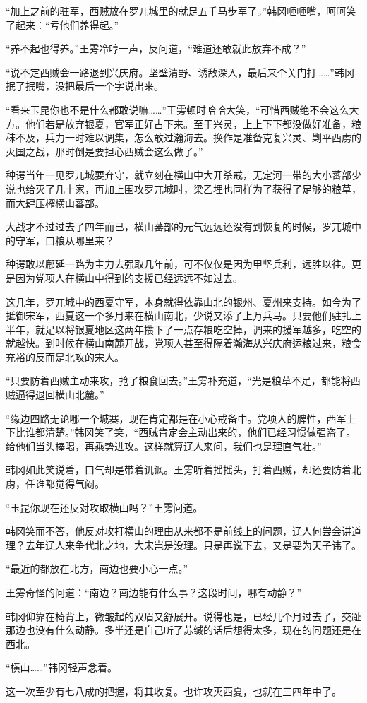 “加上之前的驻军，西贼放在罗兀城里的就足五千马步军了。”韩冈咂咂嘴，呵呵笑了起来：“亏他们养得起。”

“养不起也得养。”王雱冷哼一声，反问道，“难道还敢就此放弃不成？”

“说不定西贼会一路退到兴庆府。坚壁清野、诱敌深入，最后来个关门打……”韩冈抿了抿嘴，没把最后一个字说出来。

“看来玉昆你也不是什么都敢说嘛……”王雱顿时哈哈大笑，“可惜西贼绝不会这么大方。他们若是放弃银夏，官军正好占下来。至于兴灵，上上下下都没做好准备，粮秣不及，兵力一时难以调集，怎么敢过瀚海去。换作是准备克复兴灵、剿平西虏的灭国之战，那时倒是要担心西贼会这么做了。”

种谔当年一见罗兀城要弃守，就立刻在横山中大开杀戒，无定河一带的大小蕃部少说也给灭了几十家，再加上围攻罗兀城时，梁乙埋也同样为了获得了足够的粮草，而大肆压榨横山蕃部。

大战才不过过去了四年而已，横山蕃部的元气远远还没有到恢复的时候，罗兀城中的守军，口粮从哪里来？

种谔敢以鄜延一路为主力去强取几年前，可不仅仅是因为甲坚兵利，远胜以往。更是因为党项人在横山中得到的支援已经远远不如过去。

这几年，罗兀城中的西夏守军，本身就得依靠山北的银州、夏州来支持。如今为了抵御宋军，西夏这一个多月来在横山南北，少说又添了上万兵马。只要他们驻扎上半年，就足以将银夏地区这两年攒下了一点存粮吃空掉，调来的援军越多，吃空的就越快。到时候在横山南麓开战，党项人甚至得隔着瀚海从兴庆府运粮过来，粮食充裕的反而是北攻的宋人。

“只要防着西贼主动来攻，抢了粮食回去。”王雱补充道，“光是粮草不足，都能将西贼逼得退回横山北麓。”

“缘边四路无论哪一个城寨，现在肯定都是在小心戒备中。党项人的脾性，西军上下比谁都清楚。”韩冈笑了笑，“西贼肯定会主动出来的，他们已经习惯做强盗了。给他们当头棒喝，再乘势进攻。这样就算辽人来问，我们也是理直气壮。”

韩冈如此笑说着，口气却是带着讥讽。王雱听着摇摇头，打着西贼，却还要防着北虏，任谁都觉得气闷。

“玉昆你现在还反对攻取横山吗？”王雱问道。

韩冈笑而不答，他反对攻打横山的理由从来都不是前线上的问题，辽人何尝会讲道理？去年辽人来争代北之地，大宋岂是没理。只是再说下去，又是要为天子讳了。

“最近的都放在北方，南边也要小心一点。”

王雱奇怪的问道：“南边？南边能有什么事？这段时间，哪有动静？”

韩冈仰靠在椅背上，微皱起的双眉又舒展开。说得也是，已经几个月过去了，交趾那边也没有什么动静。多半还是自己听了苏缄的话后想得太多，现在的问题还是在西北。

“横山……”韩冈轻声念着。

这一次至少有七八成的把握，将其收复。也许攻灭西夏，也就在三四年中了。

